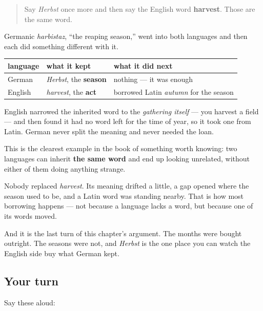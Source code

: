 \label{lesson:GE-C09-herbst-harvest}



\begin{quote}
Say \emph{Herbst} once more and then say the English word \textbf{harvest}. Those are the same word.
\end{quote}

\begin{cousinweb}
Germanic \emph{harbistaz}, \textquotedblleft{}the reaping season,\textquotedblright{} went into both languages and then each did something different with it.

\noindent
\begin{tabularx}{\linewidth}{@{}>{\raggedright\arraybackslash}X>{\raggedright\arraybackslash}X>{\raggedright\arraybackslash}X@{}}
\toprule
\textbf{language} & \textbf{what it kept} & \textbf{what it did next} \\
\midrule
German & \emph{Herbst}, the \textbf{season} & nothing — it was enough \\
English & \emph{harvest}, the \textbf{act} & borrowed Latin \emph{autumn} for the season \\
\bottomrule
\end{tabularx}

English narrowed the inherited word to the \emph{gathering itself} — you harvest a field — and then found it had no word left for the time of year, so it took one from Latin. German never split the meaning and never needed the loan.
\end{cousinweb}

\begin{culture}
This is the clearest example in the book of something worth knowing: two languages can inherit \textbf{the same word} and end up looking unrelated, without either of them doing anything strange.

Nobody replaced \emph{harvest}. Its meaning drifted a little, a gap opened where the season used to be, and a Latin word was standing nearby. That is how most borrowing happens — not because a language lacks a word, but because one of its words moved.

And it is the last turn of this chapter's argument. The months were bought outright. The seasons were not, and \emph{Herbst} is the one place you can watch the English side buy what German kept.
\end{culture}

\subsection*{Your turn}
Say these aloud:

